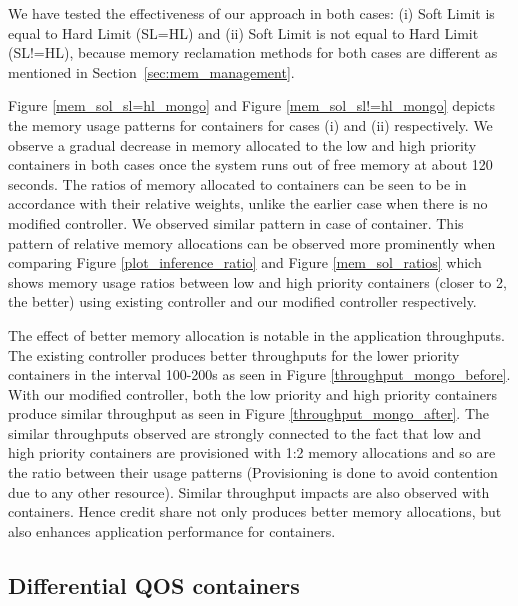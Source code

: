       We have tested the effectiveness of our approach in both cases: (i) Soft Limit is equal to Hard Limit (SL=HL) and (ii) Soft Limit is not 
equal to Hard  Limit (SL!=HL), because memory reclamation methods for both cases are different as mentioned in Section~\ref{sec:mem_management}. 

Figure \ref{mem_sol_sl=hl_mongo} and Figure \ref{mem_sol_sl!=hl_mongo} depicts the memory usage patterns for \mongodb{} containers for cases 
(i) and (ii) respectively. We observe a gradual decrease in memory allocated to the low and high priority containers in both cases once the 
system runs out of free memory at about 120 seconds. The ratios of memory allocated to containers can be seen to be in accordance with
their relative weights, unlike the earlier case when there is no modified controller.
We observed similar pattern in case of \redis{} container. 
This pattern of relative memory allocations can be observed more prominently when comparing Figure \ref{plot_inference_ratio} and Figure \ref{mem_sol_ratios} 
which shows memory usage ratios between low and high priority containers (closer to 2, the better) using existing controller and our 
modified controller respectively.

The effect of better memory allocation is notable in the application throughputs. The existing controller produces better throughputs 
for the lower priority \mongodb{} containers in the interval 100-200s as seen in Figure \ref{throughput_mongo_before}. With our modified 
controller, both the low priority and high priority containers produce similar throughput as seen in Figure \ref{throughput_mongo_after}. 
The similar throughputs observed are strongly connected to the fact that low and high priority containers are provisioned with 1:2 memory 
allocations and so are the ratio between their usage patterns (Provisioning is done to avoid contention due to any other resource). Similar 
throughput impacts are also observed with \redis{} containers. Hence credit share not only produces better memory allocations, but also 
enhances application performance for containers.
    
    \subsection{Differential QOS containers}
    
